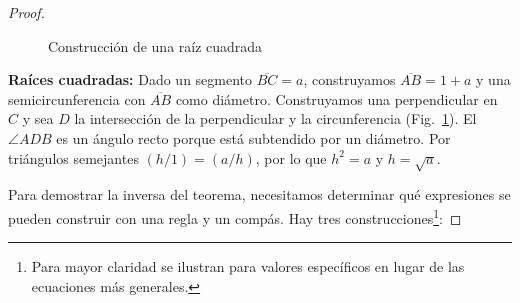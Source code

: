 \begin{proof}
\begin{figure}[t]
\begin{center}
\end{center}
\caption{Construcción de una raíz cuadrada}
\label{f.trisect-square-root}
\end{figure}

\noindent\textbf{Raíces cuadradas:}
Dado un segmento $\overline{BC}=a$, construyamos $\overline{AB} =1+a$ y una semicircunferencia con $\overline{AB}$ como diámetro. Construyamos una perpendicular en $C$ y sea $D$ la intersección de la perpendicular y la circunferencia (Fig.~\ref{f.trisect-square-root}). El $\angle ADB$ es un ángulo recto porque está subtendido por un diámetro. Por triángulos semejantes $(h/1)=(a/h)$, por lo que $h^2=a$ y $h=\sqrt{a}$.

Para demostrar la inversa del teorema, necesitamos determinar qué expresiones se pueden construir con una regla y un compás. Hay tres construcciones\footnote{Para mayor claridad se ilustran para valores específicos en lugar de las ecuaciones más generales.}:



\end{proof}
